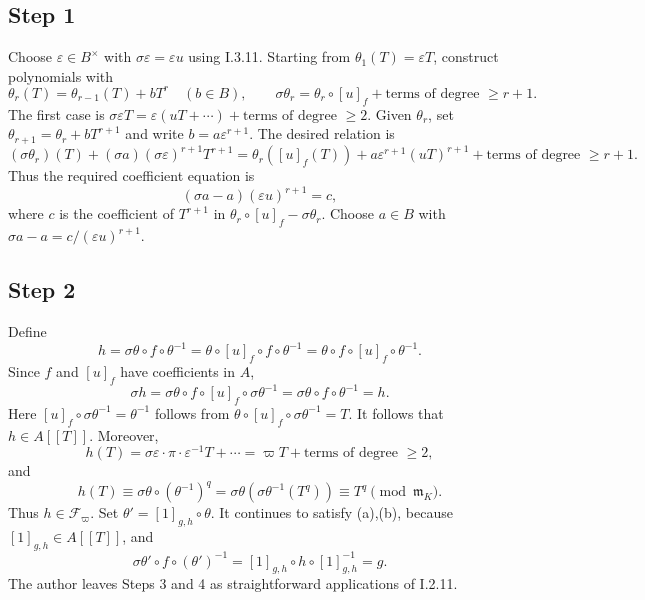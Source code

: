 \documentclass[11pt]{article}
\newcommand{\m}{\mathfrak m}
\newcommand{\terms}[1]{\text{terms of degree }\geq #1}
\begin{document}
\subsection*{Step 1}
Choose $\varepsilon\in B^\times$ with $\sigma\varepsilon=\varepsilon u$ using I.3.11.
Starting from $\theta_1(T)=\varepsilon T$, construct polynomials with
\[
 \theta_r(T)=\theta_{r-1}(T)+bT^r\quad(b\in B),\qquad
 \sigma\theta_r=\theta_r\circ[u]_f+\terms{r+1}.
\]
The first case is $\sigma\varepsilon T=\varepsilon(uT+\cdots)+\terms{2}$.
Given $\theta_r$, set $\theta_{r+1}=\theta_r+bT^{r+1}$ and write
$b=a\varepsilon^{r+1}$. The desired relation is
\[
 (\sigma\theta_r)(T)+(\sigma a)(\sigma\varepsilon)^{r+1}T^{r+1}
 =\theta_r([u]_f(T))+a\varepsilon^{r+1}(uT)^{r+1}+\terms{r+1}.
\]
Thus the required coefficient equation is
\[
 (\sigma a-a)(\varepsilon u)^{r+1}=c,
\]
where $c$ is the coefficient of $T^{r+1}$ in
$\theta_r\circ[u]_f-\sigma\theta_r$.
Choose $a\in B$ with $\sigma a-a=c/(\varepsilon u)^{r+1}$.

\subsection*{Step 2}
Define
\[
 h=\sigma\theta\circ f\circ\theta^{-1}
 =\theta\circ[u]_f\circ f\circ\theta^{-1}
 =\theta\circ f\circ[u]_f\circ\theta^{-1}.
\]
Since $f$ and $[u]_f$ have coefficients in $A$,
\[
 \sigma h=\sigma\theta\circ f\circ[u]_f\circ\sigma\theta^{-1}
 =\sigma\theta\circ f\circ\theta^{-1}=h.
\]
Here $[u]_f\circ\sigma\theta^{-1}=\theta^{-1}$ follows from
$\theta\circ[u]_f\circ\sigma\theta^{-1}=T$.
It follows that $h\in A[[T]]$. Moreover,
\[
 h(T)=\sigma\varepsilon\cdot\pi\cdot\varepsilon^{-1}T+\cdots
 =\varpi T+\terms{2},
\]
and
\[
 h(T)\equiv\sigma\theta\circ(\theta^{-1})^q
 =\sigma\theta(\sigma\theta^{-1}(T^q))\equiv T^q\pmod{\m_K}.
\]
Thus $h\in\mathcal F_\varpi$. Set $\theta'=[1]_{g,h}\circ\theta$.
It continues to satisfy (a),(b), because $[1]_{g,h}\in A[[T]]$, and
\[
 \sigma\theta'\circ f\circ(\theta')^{-1}
 =[1]_{g,h}\circ h\circ[1]_{g,h}^{-1}=g.
\]
The author leaves Steps 3 and 4 as straightforward applications of I.2.11.

\end{document}
